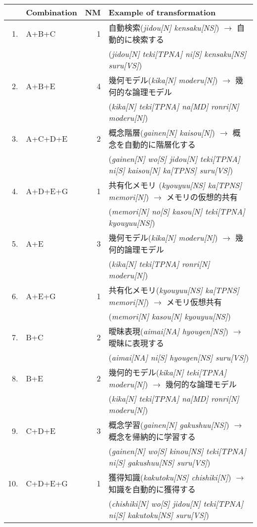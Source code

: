 {
\begin{table}
\begin{center}
\footnotesize
\begin{tabular}{|rl|r|l|}
\hline
& Combination & NM & Example of transformation\\
\hline
\hline
1. & A+B+C & 1 & 自動検索({\it jidou[N] kensaku[NS]}) $\rightarrow$ 自動的に検索する\\
& & & ({\it jidou[N] teki[TPNA] ni[S] kensaku[NS] suru[VS]})\\
2. & A+B+E & 4 & 幾何モデル({\it kika[N] moderu[N]}) $\rightarrow$ 幾何的な論理モデル\\
& & & ({\it kika[N] teki[TPNA] na[MD] ronri[N] moderu[N]})\\
3. & A+C+D+E & 2 & 概念階層({\it gainen[N] kaisou[N]}) $\rightarrow$ 概
 念を自動的に階層化する\\ 
& & & ({\it gainen[N] wo[S] jidou[N] teki[TPNA] ni[S] kaisou[N] ka[TPNS] suru[VS]})\\
4. & A+D+E+G & 1 & 共有化メモリ ({\it kyouyuu[NS] ka[TPNS] memori[N]}) $\rightarrow$ メモリの仮想的共有\\
& & & ({\it memori[N] no[S] kasou[N] teki[TPNA] kyouyuu[NS]})\\
5. & A+E & 3 & 幾何モデル({\it kika[N] moderu[N]}) $\rightarrow$ 幾何的論理モデル\\
& & & ({\it kika[N] teki[TPNA] ronri[N] moderu[N]})\\
6. & A+E+G & 1 & 共有化メモリ({\it kyouyuu[NS] ka[TPNS] memori[N]}) $\rightarrow$ メモリ仮想共有\\
& & & ({\it memori[N] kasou[N] kyouyuu[NS]})\\
7. & B+C & 2 & 曖昧表現({\it aimai[NA] hyougen[NS]}) $\rightarrow$ 曖昧に表現する\\
& & & ({\it aimai[NA] ni[S] hyougen[NS] suru[VS]})\\
8. & B+E & 2 & 幾何的モデル({\it kika[N] teki[TPNA] moderu[N]}) $\rightarrow$ 幾何的な論理モデル\\
& & & ({\it kika[N] teki[TPNA] na[MD] ronri[N] moderu[N]})\\
9. & C+D+E & 3 & 概念学習({\it gainen[N] gakushuu[NS]}) $\rightarrow$ 概念を帰納的に学習する\\
& & & ({\it gainen[N] wo[S] kinou[NS] teki[TPNA] ni[S] gakushuu[NS] suru[VS]})\\
10. & C+D+E+G & 1 & 獲得知識({\it kakutoku[NS] chishiki[N]}) $\rightarrow$ 知識を自動的に獲得する\\
& & & ({\it chishiki[N] wo[S] jidou[N] teki[TPNA] ni[S] kakutoku[NS] suru[VS]})\\

\end{tabular}
\end{center}
\end{table}}
